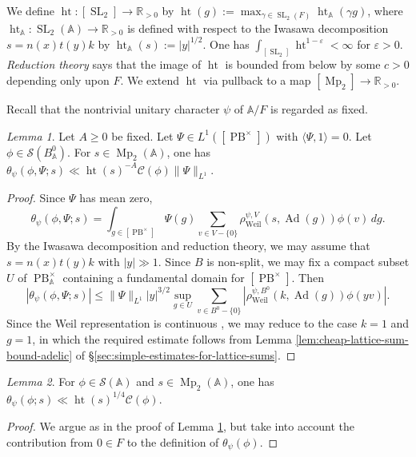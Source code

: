 \documentclass[reqno,10pt]{amsart}
\theoremstyle{plain} %
\theoremstyle{definition}
\theoremstyle{plain} %
\theoremstyle{remark}
\theoremstyle{itplain} %
\newtheorem{lemma}{Lemma}
\theoremstyle{remark} %
\renewcommand{\geq}{\geqslant}
\renewcommand{\leq}{\leqslant}
\numberwithin{equation}{section}
\DeclareMathOperator{\SL}{SL}
\DeclareMathOperator{\Mp}{Mp}
\DeclareMathOperator{\htt}{ht}
\DeclareMathOperator{\Ad}{Ad}
\def\eps{\varepsilon}
\def\PB{\operatorname{PB}}
\DeclareMathOperator{\Weil}{Weil}
\begin{document}
We define $\htt: [\SL_2] \rightarrow \mathbb{R}_{>0}$ by $\htt(g) := \max_{\gamma \in \SL_2(F)} \htt_\mathbb{A}(\gamma g)$, where $\htt_{\mathbb{A}} : \SL_2(\mathbb{A}) \rightarrow \mathbb{R}_{>0}$ is defined with respect to the Iwasawa decomposition $s = n(x) t(y) k$ by $\htt_{\mathbb{A}}(s) := |y|^{1/2}$.  One has $\int_{[\SL_2]} \htt^{1-\eps} < \infty$ for $\eps > 0$.  \emph{Reduction theory} says that the image of $\htt$ is bounded from below by some $c > 0$ depending only upon $F$.  We extend $\htt$ via pullback to a map $[\Mp_2] \rightarrow \mathbb{R}_{>0}$.


Recall that the nontrivial unitary character $\psi$ of $\mathbb{A}/F$ is regarded as fixed.
\begin{lemma}\label{lem:crude-bound-for-cuspidal-theta-functions}
  Let $A \geq 0$ be fixed.  Let $\Psi \in L^1( [\PB^\times])$ with $\langle \Psi, 1 \rangle = 0$.  Let $\phi \in \mathcal{S}(B_\mathbb{A}^0)$.  For $s \in \Mp_2(\mathbb{A})$, one has $\theta_{\psi}(\phi,\Psi;s) \ll \htt(s)^{-A} \mathcal{C}(\phi) \|\Psi \|_{L^1}$.
\end{lemma}
\begin{proof}
  Since $\Psi$ has mean zero,
  \begin{equation}
    \theta_{\psi}(\phi,\Psi;s) = \int_{g \in [\PB^\times]} \Psi(g) \sum_{v \in V - \{0\}} \rho_{\Weil}^{\psi,V}(s,\Ad(g)) \phi(v) \,d g.
  \end{equation}
  By the Iwasawa decomposition and reduction theory, we may assume that $s = n(x) t(y) k$ with $|y| \gg 1$.  Since $B$ is non-split, we may fix a compact subset $U$ of $\PB^\times_\mathbb{A}$ containing a fundamental domain for $[\PB^\times]$.  Then
  \[
    |\theta_{\psi}(\phi,\Psi;s)| \leq \|\Psi \|_{L^1} |y|^{3/2} \sup_{g \in U} \sum_{v \in B^0 - \{0\}} |\rho_{\Weil}^{\psi,B^0}(k,\Ad(g)) \phi(y v)|.
  \]
  Since the Weil representation is continuous \cite[\S39]{MR0165033}, we may reduce to the case $k = 1$ and $g = 1$, in which the required estimate follows from Lemma \ref{lem:cheap-lattice-sum-bound-adelic} of \S\ref{sec:simple-estimates-for-lattice-sums}.
\end{proof}


\begin{lemma}\label{lem:crude-bound-for-elementary-theta-functions}
  For $\phi \in \mathcal{S}(\mathbb{A})$ and $s \in \Mp_2(\mathbb{A})$, one has $\theta_{\psi}(\phi;s) \ll \htt(s)^{1/4} \mathcal{C}(\phi)$.
\end{lemma}
\begin{proof}
  We argue as in the proof of Lemma \ref{lem:crude-bound-for-cuspidal-theta-functions}, but take into account the contribution from $0 \in F$ to the definition of $\theta_{\psi}(\phi)$.
\end{proof}
\end{document}
